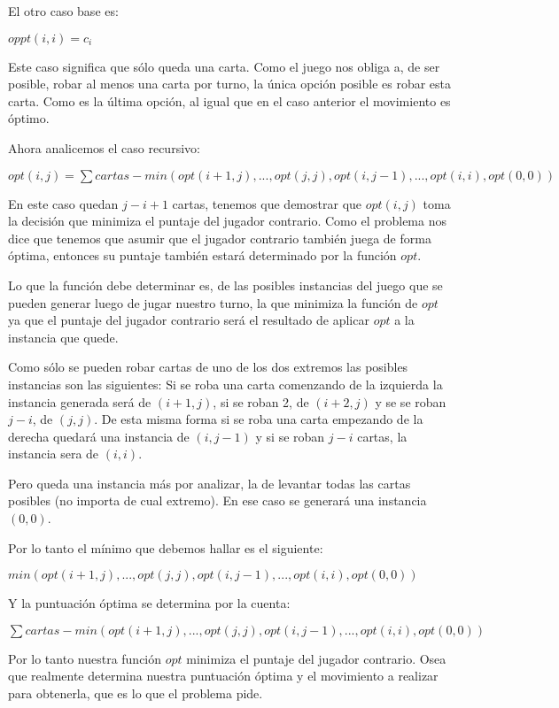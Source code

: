 El otro caso base es:

$oppt(i,i) = c_i$

Este caso significa que sólo queda una carta. Como el juego nos obliga a, de ser posible, robar al menos una carta por turno, la única opción posible es robar esta carta. Como es la última opción, al igual que en el caso anterior el movimiento es óptimo.

Ahora analicemos el caso recursivo:

$opt(i,j) = \sum cartas - min(opt(i+1, j), ..., opt(j,j), opt(i, j-1), ... ,opt(i,i), opt(0,0))$

En este caso quedan $j-i+1$ cartas, tenemos que demostrar que $opt(i,j)$ toma la decisión que minimiza el puntaje del jugador contrario. Como el problema nos dice que tenemos que asumir que el jugador contrario también juega de forma óptima, entonces su puntaje también estará determinado por la función $opt$.

Lo que la función debe determinar es, de las posibles instancias del juego que se pueden generar luego de jugar nuestro turno, la que minimiza la función de $opt$ ya que el puntaje del jugador contrario será el resultado de aplicar $opt$ a la instancia que quede.

Como sólo se pueden robar cartas de uno de los dos extremos las posibles instancias son las siguientes: Si se roba una carta comenzando de la izquierda la instancia generada será de $(i+1,j)$, si se roban 2, de $(i+2,j)$ y se se roban $j-i$, de $(j,j)$. De esta misma forma si se roba una carta empezando de la derecha quedará una instancia de $(i,j-1)$ y si se roban $j-i$ cartas, la instancia sera de $(i,i)$.

Pero queda una instancia más por analizar, la de levantar todas las cartas posibles (no importa de cual extremo). En ese caso se generará una instancia $(0,0)$.

Por lo tanto el mínimo que debemos hallar es el siguiente:

$min(opt(i+1,j), ... , opt(j,j), opt(i,j-1), ... , opt(i,i), opt(0,0))$

Y la puntuación óptima se determina por la cuenta:

$\sum cartas - min(opt(i+1,j), ... , opt(j,j), opt(i,j-1), ... , opt(i,i), opt(0,0))$

Por lo tanto nuestra función $opt$ minimiza el puntaje del jugador contrario. Osea que realmente determina nuestra puntuación óptima y el movimiento a realizar para obtenerla, que es lo que el problema pide.